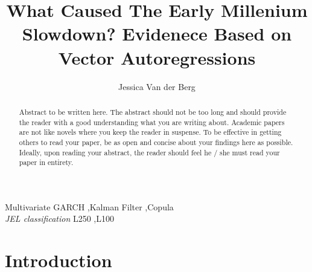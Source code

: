 \documentclass[11pt,preprint, authoryear]{elsarticle}
\numberwithin{equation}{section}
\numberwithin{figure}{section}
\numberwithin{table}{section}
\begin{document}
\begin{frontmatter}  %

\title{What Caused The Early Millenium Slowdown? Evidenece Based on
Vector Autoregressions}





\author[Add1]{Jessica Van der Berg}





\address[Add1]{20190565}


\begin{abstract}
\small{
Abstract to be written here. The abstract should not be too long and
should provide the reader with a good understanding what you are writing
about. Academic papers are not like novels where you keep the reader in
suspense. To be effective in getting others to read your paper, be as
open and concise about your findings here as possible. Ideally, upon
reading your abstract, the reader should feel he / she must read your
paper in entirety.
}
\end{abstract}

\vspace{1cm}

\begin{keyword}
\footnotesize{
Multivariate GARCH \sep Kalman Filter \sep Copula \\ \vspace{0.3cm}
\textit{JEL classification} L250 \sep L100
}
\end{keyword}
\vspace{0.5cm}
\end{frontmatter}



\pagestyle{fancy}
\chead{}
\lfoot{}
\lhead{}
\cfoot{}


\headsep 35pt %




\hypertarget{introduction}{%
\section{Introduction}\label{introduction}}
\end{document}
